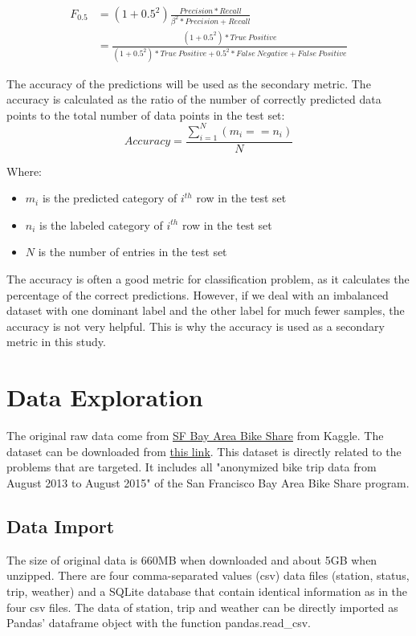 \documentclass[a4paper]{article}
\begin{document}
		\begin{equation}
			\begin{aligned}
				F_{0.5} &= (1+0.5^2)\frac{Precision * Recall}{\beta^2 * Precision + Recall}\\		
						&= \frac{(1+0.5^2)*True\ 	Positive}{(1+0.5^2)*True\ Positive + 0.5^2*False\ Negative + False\ Positive}
			\end{aligned}
		\end{equation}
				
		The accuracy of the predictions will be used as the secondary metric. The accuracy is calculated as the ratio of the number of correctly predicted data points to the total number of data points in the test set:
		\begin{equation}
		Accuracy = \frac{\sum_{i=1}^{N} (m_i == n_i)}{N}
		\end{equation}
		
		Where:
		\begin{itemize}
			\item $m_i$ is the predicted category of $i^{th}$ row in the test set
			\item $n_i$ is the labeled category of $i^{th}$ row in the test set
			\item $N$ is the number of entries in the test set
		\end{itemize}	
		
		The accuracy is often a good metric for classification problem, as it calculates the percentage of the correct predictions. However, if we deal with an imbalanced dataset with one dominant label and the other label for much fewer samples, the accuracy is not very helpful. This is why the accuracy is used as a secondary metric in this study.

\clearpage
		
	\section{Data Exploration}
		The original raw data come from \href{https://www.kaggle.com/benhamner/sf-bay-area-bike-share}{SF Bay Area Bike Share} from Kaggle. The dataset can be downloaded from \href{(https://www.kaggle.com/benhamner/sf-bay-area-bike-share/downloads/sf-bay-area-bike-share.zip)}{this link}. This dataset is directly related to the problems that are targeted. It includes all "anonymized bike trip data from August 2013 to August 2015" of the San Francisco Bay Area Bike Share program.
		

		\subsection{Data Import}			
			The size of original data is 660MB when downloaded and about 5GB when unzipped. There are four comma-separated values (csv) data files (station, status, trip, weather) and a SQLite database that contain identical information as in the four csv files. The data of station, trip and weather can be directly imported as Pandas' dataframe object with the function pandas.read\_csv. 
			
\end{document}
